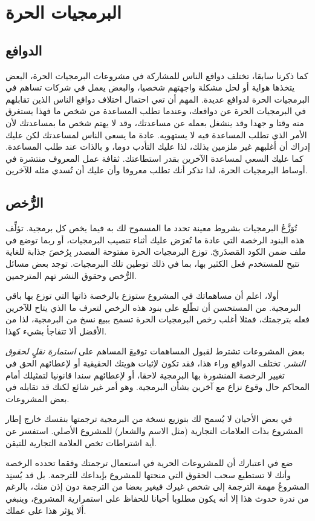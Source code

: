 \section{البرمجيات الحرة}
\subsection{الدوافع}
كما ذكرنا سابقا، تختلف دوافع الناس للمشاركة في مشروعات البرمجيات الحرة،
البعض يتخذها هواية أو لحل مشكلة واجهتهم شخصيا، والبعض يعمل في شركات
تساهم في البرمجيات الحرة لدوافع عديدة. المهم أن تعي احتمال اختلاف دوافع
الناس الذين تقابلهم في البرمجيات الحرة عن دوافعك، وعندما تطلب المساعدة
من شخص ما فهذا يستغرق منه وقتا و جهدا وقد ينشغل بعمله عن مساعدتك، وقد
لا يهتم شخص ما بمساعدتك لأن الأمر الذي تطلب المساعدة فيه لا يستهويه.
عادة ما يسعى الناس لمساعدتك لكن عليك إدراك أن أغلبهم غير ملزمين بذلك،
لذا عليك التأدب دوما، و بالذات عند طلب المساعدة. كما عليك السعي لمساعدة
الآخرين بقدر استطاعتك. ثقافة عمل المعروف منتشرة في أوساط البرمجيات
الحرة، لذا تذكر أنك تطلب معروفا وأن عليك أن تُسدي مثله للآخرين.

\subsection{الرُّخص}
تُوَزَّعُ البرمجيات بشروط معينة تحدد ما المسموح لك به فيما يخص كل
برمجية. تؤلِّف هذه البنود الرخصة التي عادة ما تُعرَض عليك أثناء تنصيب
البرمجيات، أو ربما توضع في ملف ضمن الكود المَصدَريّ. توزع البرمجيات
الحرة مفتوحة المصدر بِرُخصَ جذابة للغاية تتيح للمستخدم فعل الكثير بها،
بما في ذلك توطين تلك البرمجيات. توجد بعض مسائل الرُّخص وحقوق النشر تهم
المترجمين.

أولا، اعلم أن مساهماتك في المشروع ستوزع بالرخصة ذاتها التي توزع بها باقي
البرمجية. من المستحسن أن تطّلع على بنود هذه الرخص لتعرف ما الذي يتاح
للآخرين فعله بترجمتك، فمثلا أغلب رخص البرمجيات الحرة تسمح ببيع نسخ من
البرمجية، لذا من الأفضل ألا تتفاجأ بشيء كهذا.

بعض المشروعات تشترط لقبول المساهمات توقيعَ المساهم على {\it استمارة نقلٍ
لحقوق النشر}. تختلف الدوافع وراء هذا، فقد تكون لإثبات هويتك الحقيقية أو
لإعطائهم الحق في تغيير الرخصة المنشورة بها البرمجية لاحقا، أو لإعطائهم
سندا قانونيا لتمثيلك أمام المحاكم حال وقوع نزاع مع آخرين بشأن البرمجية.
وهو أمر غير شائع لكنك قد تقابله في بعض المشروعات.

في بعض الأحيان لا يُسمح لك بتوزيع نسخة من البرمجية ترجمتها بنفسك خارج
إطار المشروع بذات العلامات التجارية (مثل الاسم والشعار) للمشروع الأصلي.
استفسر عن أية اشتراطات تخص العلامة التجارية للتيقن.

ضع في اعتبارك أن للمشروعات الحرية في استعمال ترجمتك وفقما تحدده الرخصة
وأنك لا تستطيع سحب الحقوق التي منحتها للمشروع بإيداعك للترجمة. بل قد
يُسنِد المشروعُ مهمة الترجمة إلى شخص غيرك فيغير بعضا من الترجمة دون إذن
منك، بالرغم من ندرة حدوث هذا إلا أنه يكون مطلوبا أحيانا للحفاظ على
استمرارية المشروع، وينبغي ألا يؤثر هذا على عملك.

